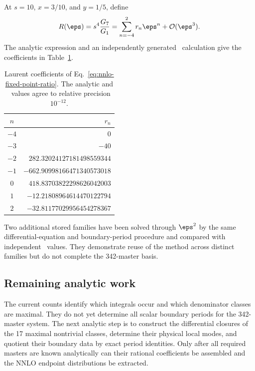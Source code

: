 At $s=10$, $x=3/10$, and $y=1/5$, define
\begin{equation}
 R(\eps)=s^4\frac{G_7}{G_1}
 =\sum_{n=-4}^{2}r_n\eps^n+\mathcal O(\eps^3).
 \label{eq:nnlo-fixed-point-ratio}
\end{equation}
The analytic expression and an independently generated \AMFlow\ calculation
give the coefficients in Table~\ref{tab:nnlo-amflow}.
\begin{table}[htbp]
\centering
\small
\begin{tabular}{@{}cr@{}}
\toprule
$n$ & $r_n$\\
\midrule
$-4$ & $0$\\
$-3$ & $-40$\\
$-2$ & $282.32024127181498559344$\\
$-1$ & $-662.90998166471340573018$\\
$0$ & $418.83703822298626042003$\\
$1$ & $-12.21808964614470122794$\\
$2$ & $-32.81177029956454278367$\\
\bottomrule
\end{tabular}
\caption{Laurent coefficients of Eq.~\eqref{eq:nnlo-fixed-point-ratio}.
The analytic and \AMFlow\ values agree to relative precision $10^{-12}$.}
\label{tab:nnlo-amflow}
\end{table}

Two additional stored families have been solved through $\eps^2$ by the
same differential-equation and boundary-period procedure and compared with
independent \AMFlow\ values.  They demonstrate reuse of the method across
distinct families but do not complete the 342-master basis.

\subsection{Remaining analytic work}

The current counts identify which integrals occur and which denominator
classes are maximal.  They do not yet determine all scalar boundary periods
for the 342-master system.  The next analytic step is to construct the
differential closures of the 17 maximal nontrivial classes, determine their
physical local modes, and quotient their boundary data by exact period
identities.  Only after all required masters are known analytically can their
rational coefficients be assembled and the NNLO endpoint distributions be
extracted.
